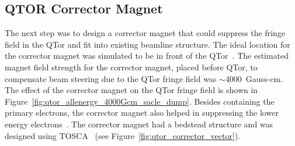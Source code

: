 \subsection{QTOR Corrector Magnet}
\label{QTOR Corrector Magnet}


The next step was to design a corrector magnet that could suppress the fringe field in the QTor and fit into existing beamline structure. The ideal location for the corrector magnet was simulated to be in front of the QTor~\cite{elog:nur_qtor5}.
The estimated magnet field strength for the corrector magnet, placed before QTor, to compensate beam steering due to the QTor fringe field was $\sim$4000~Gauss-cm. The effect of the corrector magnet on the QTor fringe field is shown in Figure~\ref{fig:qtor_allenergy_4000Gcm_sacle_dump}.
Besides containing the primary electrons, the corrector magnet also helped in suppressing the lower energy electrons~\cite{elog:nur_qtor6}. The corrector magnet had a bedstead structure and was designed using TOSCA~\cite{elog:nur_qtor7, elog:nur_qtor8} (see Figure~\ref{fig:qtor_corrector_vector}).


